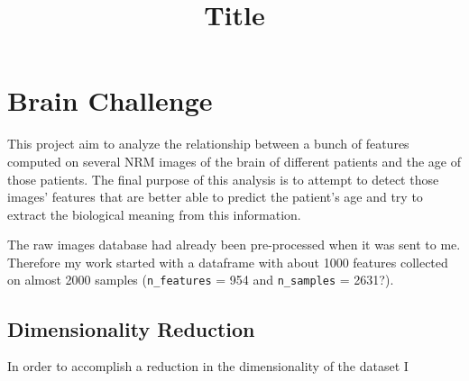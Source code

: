 \documentclass[12pt]{article}
\begin{document}
\title{Title}

\section*{Brain Challenge}

This project aim to analyze the relationship between a bunch of features computed on several NRM images of the brain of different patients and the age of those patients. The final purpose of this analysis is to attempt to detect those images' features that are better able to predict the patient's age and try to extract the biological meaning from this information.

The raw images database had already been pre-processed when it was sent to me. Therefore my work started with a dataframe with about 1000 features collected on almost 2000 samples (\texttt{n\_features} = 954 and \texttt{n\_samples} = 2631?).


\subsection*{Dimensionality Reduction}
In order to accomplish a reduction in the dimensionality of the dataset  I 
\end{document}
